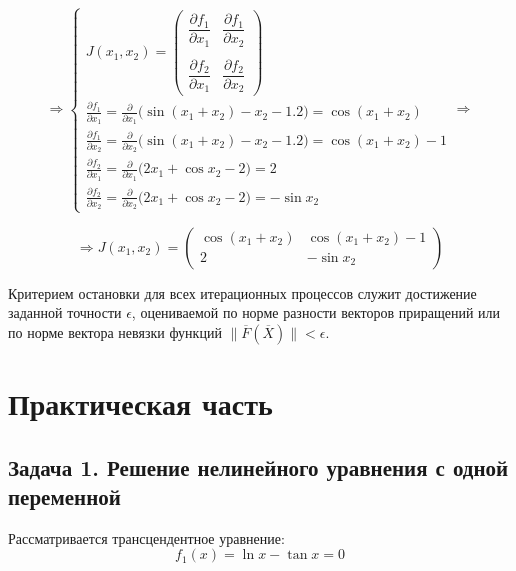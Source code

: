 \documentclass[a4paper]{article}
\begin{document}
\begin{equation}
\Rightarrow
\begin{cases}
J(x_1, x_2) = 
\begin{pmatrix}
\dfrac{\partial f_1}{\partial x_1} & \dfrac{\partial f_1}{\partial x_2} \\
\\[-0.5em]
\dfrac{\partial f_2}{\partial x_1} & \dfrac{\partial f_2}{\partial x_2}
\end{pmatrix}\\
\frac{\partial f_1}{\partial x_1} = \frac{\partial}{\partial x_1} \big(\sin(x_1 + x_2) - x_2 - 1.2\big) = \cos(x_1 + x_2) \\
\frac{\partial f_1}{\partial x_2} = \frac{\partial}{\partial x_2} \big(\sin(x_1 + x_2) - x_2 - 1.2\big) = \cos(x_1 + x_2) - 1 \\
\frac{\partial f_2}{\partial x_1} = \frac{\partial}{\partial x_1} \big(2x_1 + \cos x_2 - 2\big) = 2 \\
\frac{\partial f_2}{\partial x_2} = \frac{\partial}{\partial x_2} \big(2x_1 + \cos x_2 - 2\big) = -\sin x_2
\end{cases}
\Rightarrow
\end{equation}

\begin{equation}
\Rightarrow J(x_1, x_2) = \begin{pmatrix}
\cos(x_1 + x_2) & \cos(x_1 + x_2) - 1 \\
2 & -\sin x_2
\end{pmatrix}
\end{equation}

Критерием остановки для всех итерационных процессов служит достижение заданной точности $\epsilon$, оцениваемой по норме разности векторов приращений или по норме вектора невязки функций $\|\overline{F}(\overline{X})\| < \epsilon$.

\newpage

\section*{\centering\fontsize{14pt}{0pt}\selectfont\textbf{Практическая часть}\label{sec:practice}}

\subsection*{Задача 1. Решение нелинейного уравнения с одной переменной}

Рассматривается трансцендентное уравнение:
\begin{equation}
f_1(x) = \ln x - \tan x = 0
\end{equation}
\end{document}
